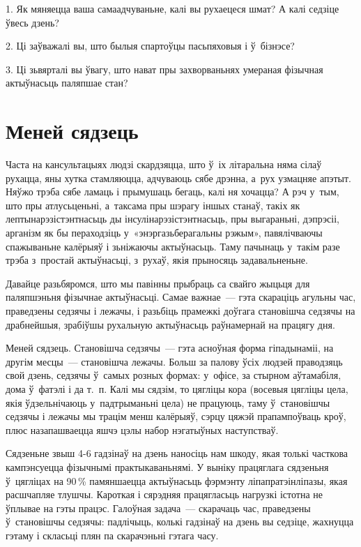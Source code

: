 1. Як мяняецца ваша самаадчуваньне, калі вы рухаецеся шмат? А калі седзіце ўвесь дзень?

2. Ці заўважалі вы, што былыя спартоўцы пасьпяховыя і ў~бізнэсе?

3. Ці зьвярталі вы ўвагу, што нават пры захворваньнях умераная фізычная актыўнасьць паляпшае стан?


\section{Меней сядзець}

Часта на кансультацыях людзі скардзяцца, што ў~іх літаральна няма сілаў рухацца, яны хутка стамляюцца, адчуваюць сябе дрэнна, а~рух узмацняе апэтыт. Няўжо трэба сябе ламаць і прымушаць бегаць, калі ня хочацца? А рэч у~тым, што пры атлусьценьні, а~таксама пры шэрагу іншых станаў, такіх як лептынарэзістэнтнасьць ды інсулінарэзістэнтнасьць, пры выгараньні, дэпрэсіі, арганізм як бы пераходзіць у~«энэргазьберагальны рэжым», павялічваючы спажываньне калёрыяў і зьніжаючы актыўнасьць. Таму пачынаць у~такім разе трэба з~простай актыўнасьці, з~рухаў, якія прыносяць задавальненьне.

Давайце разьбяромся, што мы павінны прыбраць са свайго жыцьця для паляпшэньня фізычнае актыўнасьці. Самае важнае~--- гэта скараціць агульны час, праведзены седзячы і лежачы, і разьбіць прамежкі доўгага становішча седзячы на драбнейшыя, зрабіўшы рухальную актыўнасьць раўнамернай на працягу дня.

Меней сядзець. Становішча седзячы~--- гэта асноўная форма гіпадынаміі, на другім месцы~--- становішча лежачы. Больш за палову ўсіх людзей праводзяць свой дзень, седзячы ў~самых розных формах: у~офісе, за стырном аўтамабіля, дома ў~фатэлі і да т.~п. Калі мы сядзім, то цягліцы кора (восевыя цягліцы цела, якія ўдзельнічаюць у~падтрыманьні цела) не працуюць, таму ў~становішчы седзячы і лежачы мы трацім менш калёрыяў, сэрцу цяжэй прапампоўваць кроў, плюс назапашваецца яшчэ цэлы набор нэгатыўных наступстваў.

Сядзеньне звыш 4-6 гадзінаў на дзень наносіць нам шкоду, якая толькі часткова кампэнсуецца фізычнымі практыкаваньнямі. У выніку працяглага сядзеньня ў~цягліцах на 90\,\% памяншаецца актыўнасьць фэрмэнту ліпапратэінліпазы, якая расшчапляе тлушчы. Кароткая і сярэдняя працягласьць нагрузкі істотна не ўплывае на гэты працэс. Галоўная задача~--- скарачаць час, праведзены ў~становішчы седзячы: падлічыць, колькі гадзінаў на дзень вы седзіце, жахнуцца гэтаму і скласьці плян па скарачэньні гэтага часу.

